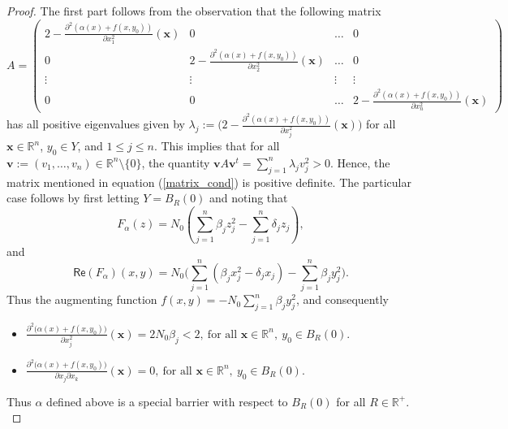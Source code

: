 \documentclass[10pt,a4paper]{amsart}
\def\R{\mathbb{R}}                              %
\begin{document}
\begin{proof}
	The first part follows from the observation that the following matrix
\begin{equation*}
A=
	\begin{pmatrix}
	2-\frac{\partial^2(\alpha(x)+f(x,y_0))}{\partial x_1^2}(\mathbf{x}) & 0  &\ldots& 0\\
	0 & 2-\frac{\partial^2(\alpha(x)+f(x,y_0))}{\partial x_2^2}(\mathbf{x}) &\ldots& 0\\	
\vdots & \vdots &\vdots& \vdots\\
0 & 0 &\ldots& 2-\frac{\partial^2(\alpha(x)+f(x,y_0))}{\partial x_n^2}(\mathbf{x})	
\end{pmatrix}
\end{equation*}
has all positive eigenvalues given by $\lambda_j:=\big(2-\frac{\partial^2(\alpha(x)+f(x,y_0))}{\partial x_j^2}(\mathbf{x})\big)$ for all $\mathbf{x}\in \R^n$, $y_0\in Y$, and $1\leq j\leq n.$ This implies that for all $\textbf{v}:=(v_1,\ldots,v_n)\in \R^n\setminus\{0\}$, the quantity $\textbf{v}A \textbf{v}^t=\sum_{j=1}^n \lambda_j v_j^2>0.$ Hence, the matrix mentioned in equation (\ref{matrix_cond}) is positive definite. The particular case follows by first letting $Y=B_R(0)$ and noting that
	$$F_{\alpha} (z)=N_0(\sum_{j=1}^{n}\beta_jz_j^2-\sum_{j=1}^{n}\delta_jz_j),$$ and $$\textsf{Re}(F_{\alpha})(x,y)=N_0\Big(\sum_{j=1}^{n}(\beta_jx_j^2-\delta_jx_j)-\sum_{j=1}^{n}\beta_jy_j^2\Big).$$
	Thus the augmenting function $f(x,y)=-N_0\sum\limits_{j=1}^{n}\beta_jy_j^2$, and consequently 
	\begin{itemize}
		\item[(a)] $\frac{\partial^2\big(\alpha(x)+f(x,y_0)\big)}{\partial x_j^2}(\mathbf{x})=2N_0\beta_j<2,~\text{for all } \mathbf{x}\in \R^n, ~y_0\in B_R(0).$\\
		\item [(b)] $\frac{\partial^2\big(\alpha(x)+f(x,y_0)\big)}{\partial x_j\partial x_k }(\mathbf{x})=0, ~ \text{for all } \mathbf{x}\in \R^n,~  y_0\in B_R(0).$\\
		
	\end{itemize}
	Thus $\alpha$ defined above is a special barrier with respect to $B_R(0)$ for all $R\in \R^+.$ 
\end{proof}
\end{document}
